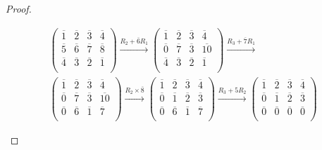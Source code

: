 \begin{proof}
	\begin{parts}
	\item
		\begin{gather*}
		\left(
\begin{array}{cccc}
 \overline{1} & \overline{2} & \overline{3} & \overline{4} \\
 \overline{5} & \overline{6} & \overline{7} & \overline{8} \\
 \overline{4} & \overline{3} & \overline{2} & \overline{1} \\
\end{array}
\right) \xrightarrow{R_2+\overline{6}R_1} \left(
\begin{array}{cccc}
 \overline{1} & \overline{2} & \overline{3} & \overline{4} \\
 \overline{0} & \overline{7} & \overline{3} & \overline{10} \\
 \overline{4} & \overline{3} & \overline{2} & \overline{1} \\
\end{array}
\right) \xrightarrow{R_3+\overline{7}R_1} \\\left(
\begin{array}{cccc}
 \overline{1} & \overline{2} & \overline{3} & \overline{4} \\
 \overline{0} & \overline{7} & \overline{3} & \overline{10} \\
 \overline{0} & \overline{6} & \overline{1} & \overline{7} \\
\end{array}
\right) \xrightarrow{R_2\times \overline{8}} \left(
\begin{array}{cccc}
 \overline{1} & \overline{2} & \overline{3} & \overline{4} \\
 \overline{0} & \overline{1} & \overline{2} & \overline{3} \\
 \overline{0} & \overline{6} & \overline{1} & \overline{7} \\
\end{array}
\right) \xrightarrow{R_3+5R_2} \left(
\begin{array}{cccc}
 \overline{1} & \overline{2} & \overline{3} & \overline{4} \\
 \overline{0} & \overline{1} & \overline{2} & \overline{3} \\
 \overline{0} & \overline{0} & \overline{0} & \overline{0} \\
\end{array}
\right)	
		\end{gather*}

\end{parts}
\end{proof}
